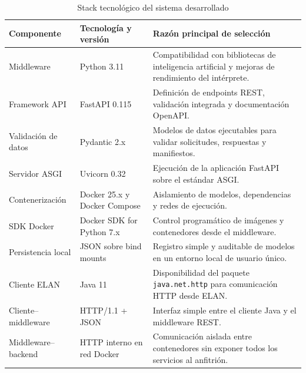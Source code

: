 \begin{table}[H]
\centering
\caption{Stack tecnológico del sistema desarrollado}
\label{tab:stack_tecnologico}
\footnotesize
\renewcommand{\arraystretch}{1.18}
\setlength{\tabcolsep}{5pt}

\begin{tabular}{
    >{\raggedright\arraybackslash}p{3.1cm}
    >{\raggedright\arraybackslash}p{3.4cm}
    >{\raggedright\arraybackslash}p{6.2cm}
}
\toprule
\textbf{Componente} & \textbf{Tecnología y versión} & \textbf{Razón principal de selección} \\
\midrule

Middleware &
Python 3.11 &
Compatibilidad con bibliotecas de inteligencia artificial y mejoras de rendimiento del intérprete. \\

Framework API &
FastAPI 0.115 &
Definición de endpoints REST, validación integrada y documentación OpenAPI. \\

Validación de datos &
Pydantic 2.x &
Modelos de datos ejecutables para validar solicitudes, respuestas y manifiestos. \\

Servidor ASGI &
Uvicorn 0.32 &
Ejecución de la aplicación FastAPI sobre el estándar ASGI. \\

Contenerización &
Docker 25.x y Docker Compose &
Aislamiento de modelos, dependencias y redes de ejecución. \\

SDK Docker &
Docker SDK for Python 7.x &
Control programático de imágenes y contenedores desde el middleware. \\

Persistencia local &
JSON sobre bind mounts &
Registro simple y auditable de modelos en un entorno local de usuario único. \\

Cliente ELAN &
Java 11 &
Disponibilidad del paquete \texttt{java.net.http} para comunicación HTTP desde ELAN. \\

Cliente--middleware &
HTTP/1.1 + JSON &
Interfaz simple entre el cliente Java y el middleware REST. \\

Middleware--backend &
HTTP interno en red Docker &
Comunicación aislada entre contenedores sin exponer todos los servicios al anfitrión. \\

\bottomrule
\end{tabular}
\end{table}

